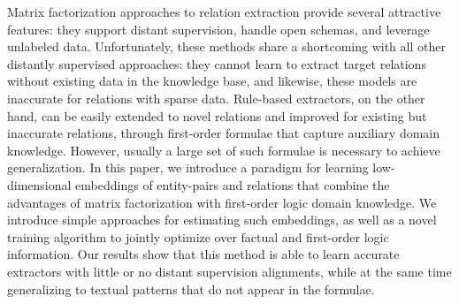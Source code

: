 Matrix factorization approaches to relation extraction provide several attractive features: they support distant supervision, handle open schemas, and leverage unlabeled data. Unfortunately, these methods share a shortcoming with all other distantly supervised approaches: they cannot learn to extract target relations without existing data in the knowledge base, and likewise, these models are inaccurate for relations with sparse data. Rule-based extractors, on the other hand, can be easily extended to novel relations and improved for existing but inaccurate relations, through first-order formulae that capture auxiliary domain knowledge. However, usually a large set of such formulae is necessary to achieve generalization. In this paper, we introduce a paradigm for learning low-dimensional embeddings of entity-pairs and relations that combine the advantages of matrix factorization with first-order logic domain knowledge. We introduce simple approaches for estimating such embeddings, as well as a novel training algorithm to jointly optimize over factual and first-order logic information. Our results show that this method is able to learn accurate extractors with little or no distant supervision alignments, while at the same time generalizing to textual patterns that do not appear in the formulae.
